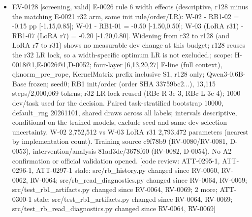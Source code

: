 \documentclass[11pt]{article}
\begin{document}
\begin{itemize}
\item EV-0128 [screening, valid] E-0026 rule 6 width effects (descriptive, r128 minus the matching E-0021 r32 arm, same init rule/order/LR): W-02 - RB1-02 = -0.15 pp [-1.15,0.85]; W-01 - RB1-01 = -0.50 [-1.50,0.50]; W-03 (LoRA r31) - RB1-07 (LoRA r7) = -0.20 [-1.20,0.80]. Widening from r32 to r128 (and LoRA r7 to r31) shows no measurable dev change at this budget; r128 reuses the r32 LR lock, so a width-specific optimum LR is not excluded.; scope: H-0018@1,E-0026@1,D-0052; four-layer [6,13,20,27] F-line (full context), qknorm\_pre\_rope, KernelMatrix prefix inclusive S1, r128 only; Qwen3-0.6B-Base frozen; seed0; RB1 init/order (order SHA 33759bc2...), 13,115 steps/2,000,069 tokens; r32 LR lock reused (RBc-R 3e-3, RBc-L 3e-4); 1000 dev/task used for the decision. Paired task-stratified bootstrap 10000, default\_rng 20261101, shared draws across all labels; intervals descriptive, conditional on the trained models, exclude seed and same-dev selection uncertainty. W-02 2,752,512 vs W-03 LoRA r31 2,793,472 parameters (nearest by implementation count). Training source c9f78b9 (RV-0080/RV-0081, D-0053), intervention/analysis 81ad3de/3678f60 (RV-0082, D-0054). No A2 confirmation or official validation opened. [code review: ATT-0295-1, ATT-0296-1, ATT-0297-1 stale: src/rb\_history.py changed since RV-0060, RV-0062, RV-0064; src/rb\_read\_diagnostics.py changed since RV-0064, RV-0069; src/test\_rb1\_artifacts.py changed since RV-0064, RV-0069; 2 more; ATT-0300-1 stale: src/test\_rb1\_artifacts.py changed since RV-0064, RV-0069; src/test\_rb\_read\_diagnostics.py changed since RV-0064, RV-0069]

\end{itemize}
\end{document}

